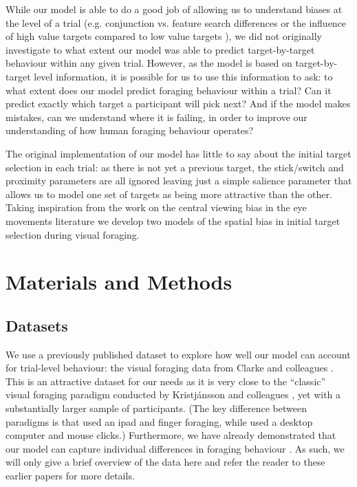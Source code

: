 \documentclass[preprints, article,submit,pdftex,moreauthors]{Definitions/mdpi}
\begin{document}
While our model is able to do a good job of allowing us to understand biases at the level of a trial (e.g. conjunction vs. feature search differences \cite{kristjansson2014} or the influence of high value targets compared to low value targets \cite{tagu2020}), we did not originally investigate to what extent our model was able to predict target-by-target behaviour within any given trial. However, as the model is based on target-by-target level information, it is possible for us to use this information to ask: to what extent does our model predict foraging behaviour within a trial? Can it predict exactly which target a participant will pick next? And if the model makes mistakes, can we understand where it is failing, in order to improve our understanding of how human foraging behaviour operates?

The original implementation of our model has little to say about the initial target selection in each trial: as there is not yet a previous target, the stick/switch and proximity parameters are all ignored leaving just a simple salience parameter that allows us to model one set of targets as being more attractive than the other. Taking inspiration from the work on the central viewing bias in the eye movements literature \cite{clarke2014deriving, clarke2017} we develop two models of the spatial bias in initial target selection during visual foraging.  

\section{Materials and Methods}

\subsection{Datasets}

We use a previously published dataset to explore how well our model can account for trial-level behaviour: the visual foraging data from Clarke and colleagues \cite{clarke2022}. This is an attractive dataset for our needs as it is very close to the ``classic'' visual foraging paradigm conducted by Kristjánsson and colleagues \citep{kristjansson2014}, yet with a substantially larger sample of participants. (The key difference between paradigms is that \cite{kristjansson2014} used an ipad and finger foraging, while \cite{clarke2022} used a desktop computer and mouse clicks.) Furthermore, we have already demonstrated that our model can capture individual differences in foraging behaviour \citep{clarke2022}. As such, we will only give a brief overview of the data here and refer the reader to these earlier papers for more details.
\end{document}
